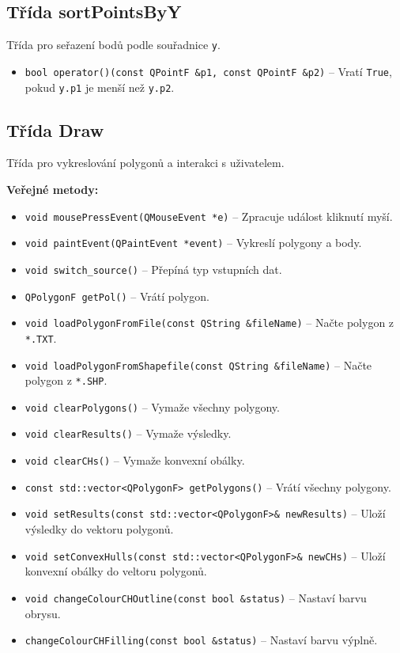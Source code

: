 \subsection{Třída sortPointsByY}
Třída pro seřazení bodů podle souřadnice \texttt{y}.
\begin{itemize}
    \item \texttt{bool  operator()(const QPointF \&p1, const QPointF \&p2)} – Vratí \texttt{True}, pokud \texttt{y.p1} je menší než \texttt{y.p2}.
\end{itemize}

\subsection{Třída Draw}
Třída pro vykreslování polygonů a interakci s uživatelem.

\textbf{Veřejné metody:}
\begin{itemize}
    \item \texttt{void mousePressEvent(QMouseEvent *e)} – Zpracuje událost kliknutí myší.
    \item \texttt{void paintEvent(QPaintEvent *event)} – Vykreslí polygony a body.
    \item \texttt{void switch\_source()} – Přepíná typ vstupních dat.
    \item \texttt{QPolygonF getPol()} – Vrátí polygon.
    \item \texttt{void loadPolygonFromFile(const QString \&fileName)} – Načte polygon z \texttt{*.TXT}.
    \item \texttt{void loadPolygonFromShapefile(const QString \&fileName)} – Načte polygon z \texttt{*.SHP}.
    \item \texttt{void clearPolygons()} – Vymaže všechny polygony.
    \item \texttt{void clearResults()} – Vymaže výsledky.
    \item \texttt{void clearCHs()} – Vymaže konvexní obálky.
    \item \texttt{const std::vector<QPolygonF> getPolygons()} – Vrátí všechny polygony.
    \item \texttt{void setResults(const std::vector<QPolygonF>\& newResults)} – Uloží výsledky do vektoru polygonů.
    \item \texttt{void setConvexHulls(const std::vector<QPolygonF>\& newCHs)} – Uloží konvexní obálky do veltoru polygonů.
    \item \texttt{void changeColourCHOutline(const bool \&status)} – Nastaví barvu obrysu.
    \item \texttt{changeColourCHFilling(const bool \&status)} – Nastaví barvu výplně.
\end{itemize}


